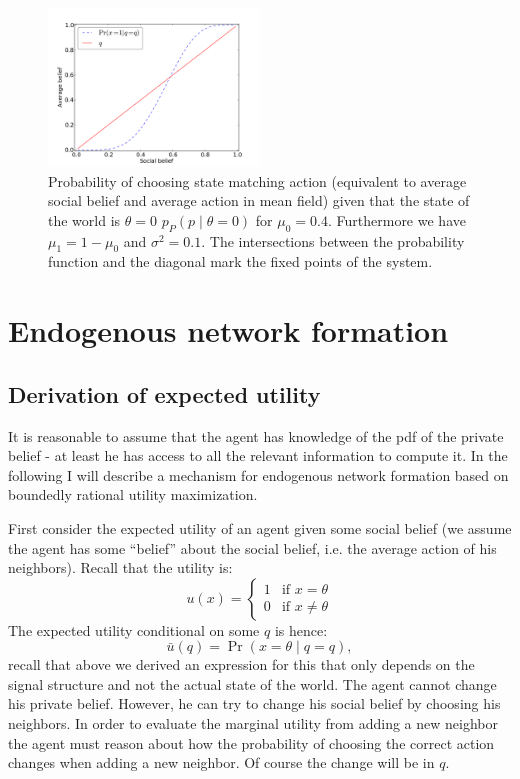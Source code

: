 \documentclass[10pt,a4paper]{article}
\begin{document}
\begin{figure}[ht]
\centering
\includegraphics[width=0.5\textwidth]{figures/EQ_SOCIAL_BELIEF}
\caption{Probability of choosing state matching action (equivalent to average social belief and average action in mean field) given that the state of the world is $\theta=0$ $p_P(p \mid \theta = 0)$ for $\mu_0 = 0.4$. Furthermore we have $\mu_1 = 1 - \mu_0$ and $\sigma^2 = 0.1$. The intersections between the probability function and the diagonal mark the fixed points of the system. }
\label{FIG::EQ_SOCIAL_BELIEF}
\end{figure}

\section{Endogenous network formation}
\subsection{Derivation of expected utility}
It is reasonable to assume that the agent has knowledge of the pdf of the private belief - at least he has access to all the relevant information to compute it. In the following I will describe a mechanism for endogenous network formation based on boundedly rational utility maximization.

First consider the expected utility of an agent given some social belief (we assume the agent has some ``belief'' about the social belief, i.e. the average action of his neighbors). Recall that the utility is:
\begin{equation}
u(x) = \begin{cases} 1 &\mbox{if } x= \theta  \\
0 & \mbox{if } x \neq \theta\end{cases}
\end{equation}
The expected utility conditional on some $q$ is hence:
\begin{equation}
\bar{u}(q) = \Pr(x = \theta \mid q = q),
\end{equation}
recall that above we derived an expression for this that only depends on the signal structure and not the actual state of the world. The agent cannot change his private belief. However, he can try to change his social belief by choosing his neighbors. In order to evaluate the marginal utility from adding a new neighbor the agent must reason about how the probability of choosing the correct action changes when adding a new neighbor. Of course the change will be in $q$.
\end{document}
